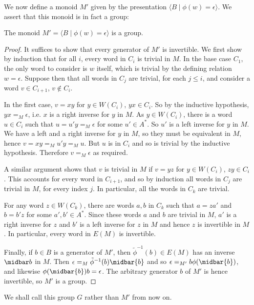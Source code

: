 \documentclass[nosubthm]{lmaths}
\begin{document}
We now define a monoid $M'$ given by the presentation $\langle B \mid \phi(w) = \epsilon \rangle$. We assert that this monoid is in fact a group:

\begin{lemma}
	The monoid $M' = \langle B \mid \phi(w) = \epsilon\rangle$ is a group.
\end{lemma}
\begin{proof}
	It suffices to show that every generator of $M'$ is invertible. We first show by induction that for all $i$, every word in $C_i$ is trivial in $M$. In the base case $C_1$, the only word to consider is $w$ itself, which is trivial by the defining relation $w = \epsilon$. Suppose then that all words in $C_j$ are trivial, for each $j \le i$, and consider a word $v \in C_{i+1}$, $v \not\in C_i$.

	In the first case, $v = xy$ for $y \in W(C_i)$, $yx \in C_i$. So by the inductive hypothesis, $yx =_M \epsilon$, i.e. $x$ is a right inverse for $y$ in $M$. As $y \in W(C_i)$, there is a word $u \in C_i$ such that $u = u'y =_M \epsilon$ for some $u' \in A^*$. So $u'$ is a left inverse for $y$ in $M$. We have a left and a right inverse for $y$ in $M$, so they must be equivalent in $M$, hence $v = xy =_M u'y =_M u$. But $u$ is in $C_i$ and so is trivial by the inductive hypothesis. Therefore $v =_M \epsilon$ as required.

	A similar argument shows that $v$ is trivial in $M$ if $v = yz$ for $y \in W(C_i)$, $zy \in C_i$. This accounts for every word in $C_{i+1}$, and so by induction all words in $C_j$ are trivial in $M$, for every index $j$. In particular, all the words in $C_k$ are trivial.

	For any word $z \in W(C_k)$, there are words $a, b$ in $C_k$ such that $a = za'$ and $b = b'z$ for some $a', b' \in A^*$. Since these words $a$ and $b$ are trivial in $M$, $a'$ is a right inverse for $z$ and $b'$ is a left inverse for $z$ in $M$ and hence $z$ is invertible in $M$. In particular, every word in $E(M)$ is invertible.

	Finally, if $b \in B$ is a generator of $M'$, then $\tilde\phi^{-1}(b) \in E(M)$ has an inverse $\midbar b$ in $M$. Then $\epsilon =_M \tilde\phi^{-1}(b) \midbar{b}$ and so $\epsilon =_{M'} b\phi(\midbar{b})$, and likewise $\phi(\midbar{b})b = \epsilon$. The arbitrary generator $b$ of $M'$ is hence invertible, so $M'$ is a group.
\end{proof}

We shall call this group $G$ rather than $M'$ from now on.
\end{document}
